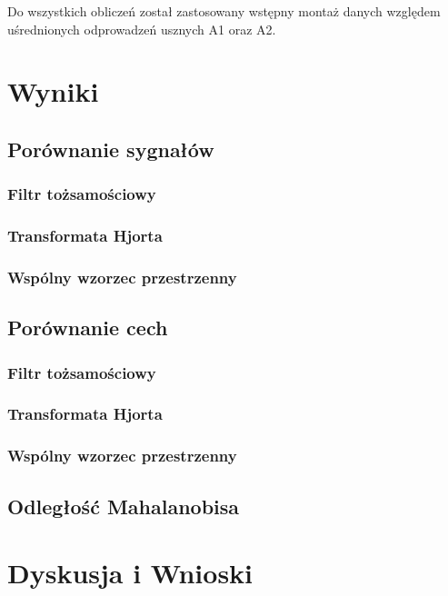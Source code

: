 \documentclass[licencjacka,openright]{pracamgr}
\begin{document}
Do wszystkich obliczeń został zastosowany wstępny montaż danych względem uśrednionych odprowadzeń usznych A1 oraz A2. 





\chapter{Wyniki}

\section{Porównanie sygnałów}

\subsection{Filtr tożsamościowy}
\subsection{Transformata Hjorta}
\subsection{Wspólny wzorzec przestrzenny}

\section{Porównanie cech}

\subsection{Filtr tożsamościowy}
\subsection{Transformata Hjorta}
\subsection{Wspólny wzorzec przestrzenny}

\section{Odległość Mahalanobisa}

\chapter{Dyskusja i Wnioski}



\end{document}
